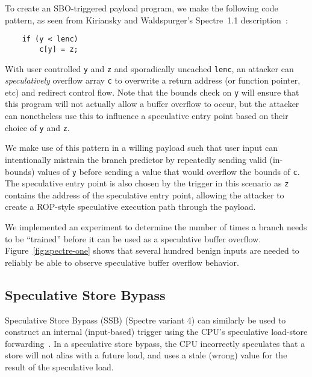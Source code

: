 
To create an SBO-triggered payload program, we make the following code pattern,
as seen from Kiriansky and Waldspurger's Spectre~1.1
description~\cite{kiriansky2018speculative}:
\begin{lstlisting}
    if (y < lenc)
        c[y] = z;
\end{lstlisting}
With user controlled 
\texttt{y} and \texttt{z} and sporadically uncached \texttt{lenc}, an attacker 
can \textit{speculatively} overflow array \texttt{c}
to overwrite a return address (or function pointer, etc) and redirect control
flow. Note that the bounds check on \texttt{y} will ensure that this program
will not actually allow a buffer overflow to occur, but the attacker can
nonetheless use this to influence a speculative entry point based on their
choice of \texttt{y} and \texttt{z}.


We make use of this pattern in a willing payload such that user input can intentionally
mistrain the branch predictor by repeatedly sending valid (in-bounds) values of
\texttt{y} before sending a value that would overflow the bounds of \texttt{c}.
The speculative entry point is also chosen by the 
trigger in this scenario as \texttt{z} contains the address of the 
speculative entry point, allowing the attacker to create a ROP-style speculative 
execution path through the payload.

\FigSpectreOne
We implemented an experiment to determine the number of times a branch needs to
be ``trained'' before it can be used as a speculative buffer overflow.
Figure~\ref{fig:spectre-one} shows that several hundred benign inputs are needed
to reliably be able to observe speculative buffer overflow behavior.

\subsection{Speculative Store Bypass}

Speculative Store Bypass (SSB) (Spectre variant 4) can similarly be used to
construct an internal (input-based) trigger using the CPU's speculative
load-store forwarding~\cite{spec-store-bypass}. In a speculative store bypass,
the CPU incorrectly speculates that a store will not alias with a future load,
and uses a stale (wrong) value for the result of the speculative load.


